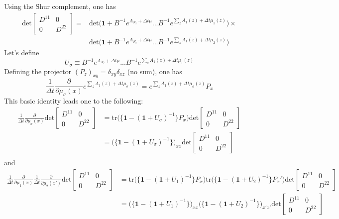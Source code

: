 Using the Shur complement, one has
\begin{align*} 
\text{det}
 \begin{bmatrix}
D^{11} & 0 \\ 
0 & D^{22}
\end{bmatrix}
= & 
\text{det}\Big( \mathbf{1} + B^{-1} e^{A_{N_t}+\Delta t \mu} ... B^{-1} e^{\sum_zA_{1}(z)+\Delta t \mu_1(z)}\Big) \times \\
& \text{det}\Big( \mathbf{1} + B^{-1} e^{A_{N_t}+\Delta t \mu} ... B^{-1} e^{\sum_zA_{1}(z)+\Delta t \mu_2(z)}\Big)
\end{align*}
Let's define
\begin{equation}
U_{\sigma} \equiv B^{-1} e^{A_{N_t}+\Delta t \mu} ... B^{-1} e^{\sum_zA_{1}(z)+\Delta t \mu_1(z)} 
\end{equation}
Defining the projector $(P_z)_{xy} = \delta_{xy} \delta_{xz}$ (no sum), one has
\begin{equation*}
\frac{1}{\Delta t} \frac{\partial}{\partial \mu_\sigma(x)}e^{\sum_zA_{1}(z)+\Delta t \mu_{\sigma}(z)} = e^{\sum_zA_{1}(z)+\Delta t \mu_{\sigma}(z)} P_x 
\end{equation*}
This basic identity leads one to the following:
\begin{align*}
\frac{1}{\Delta t} \frac{\partial}{\partial \mu_\sigma(x)} \text{det}
 \begin{bmatrix}
D^{11} & 0 \\ 
0 & D^{22}
\end{bmatrix}
& =
\text{tr} \Big(\Big\{ \mathbf{1} - (\mathbf{1} + U_{\sigma})^{-1} \Big\} P_x \Big)
\text{det}
 \begin{bmatrix}
D^{11} & 0 \\ 
0 & D^{22}
\end{bmatrix} \\
& = 
\Big(\Big\{ \mathbf{1} - (\mathbf{1} + U_{\sigma})^{-1} \Big\} \Big)_{xx}
\text{det}
 \begin{bmatrix}
D^{11} & 0 \\ 
0 & D^{22}
\end{bmatrix} \\
\end{align*} 
and 
\begin{align*}
\frac{1}{\Delta t} \frac{\partial}{\partial \mu_1(x)} \frac{1}{\Delta t} \frac{\partial}{\partial \mu_2(x')} \text{det}
 \begin{bmatrix}
D^{11} & 0 \\ 
0 & D^{22}
\end{bmatrix}
& =
\text{tr} \Big(\Big\{ \mathbf{1} - (\mathbf{1} + U_{1})^{-1} \Big\} P_x \Big) 
\text{tr} \Big(\Big\{ \mathbf{1} - (\mathbf{1} + U_{2})^{-1} \Big\} P_x' \Big)
\text{det}
 \begin{bmatrix}
D^{11} & 0 \\ 
0 & D^{22}
\end{bmatrix} \\
& = 
\Big(\Big\{ \mathbf{1} - (\mathbf{1} + U_{1})^{-1} \Big\} \Big)_{xx}
\Big(\Big\{ \mathbf{1} - (\mathbf{1} + U_{2})^{-1} \Big\} \Big)_{x'x'}
\text{det}
 \begin{bmatrix}
D^{11} & 0 \\ 
0 & D^{22}
\end{bmatrix} \\
\end{align*} 
